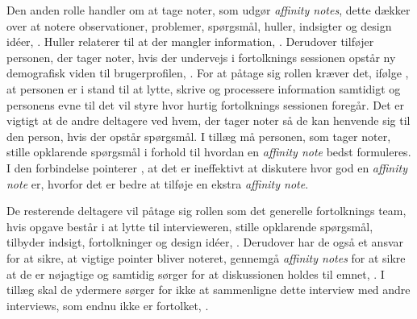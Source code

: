 Den anden rolle handler om at tage noter, som udgør \textit{affinity notes}, dette dækker over at notere observationer, problemer, spørgsmål, huller, indsigter og design idéer, \parencite[s. 107]{Book:CIInterpretationSession}. Huller relaterer til at der mangler information, \parencite[s. 162]{Book:BuildingAnAffinity}. Derudover tilføjer personen, der tager noter, hvis der undervejs i fortolknings sessionen opstår ny demografisk viden til brugerprofilen, \parencite[s. 107]{Book:CIInterpretationSession}. For at påtage sig rollen kræver det, ifølge \textcite[s. 107]{Book:CIInterpretationSession}, at personen er i stand til at lytte, skrive og processere information samtidigt og personens evne til det vil styre hvor hurtig fortolknings sessionen foregår. Det er vigtigt at de andre deltagere ved hvem, der tager noter så de kan henvende sig til den person, hvis der opstår spørgsmål. I tillæg må personen, som tager noter, stille opklarende spørgsmål i forhold til hvordan en \textit{affinity note} bedst formuleres. I den forbindelse pointerer \textcite[s. 108]{Book:CIInterpretationSession}, at det er ineffektivt at diskutere hvor god en \textit{affinity note} er, hvorfor det er bedre at tilføje en ekstra \textit{affinity note}. 

De resterende deltagere vil påtage sig rollen som det generelle fortolknings team, hvis opgave består i at lytte til intervieweren, stille opklarende spørgsmål, tilbyder indsigt, fortolkninger og design idéer, \parencite[s. 108]{Book:CIInterpretationSession}. Derudover har de også et ansvar for at sikre, at vigtige pointer bliver noteret, gennemgå \textit{affinity notes} for at sikre at de er nøjagtige og samtidig sørger for at diskussionen holdes til emnet, \parencite[s. 108]{Book:CIInterpretationSession}. I tillæg skal de ydermere sørger for ikke at sammenligne dette interview med andre interviews, som endnu ikke er fortolket, \parencite[s. 108]{Book:CIInterpretationSession}. 

